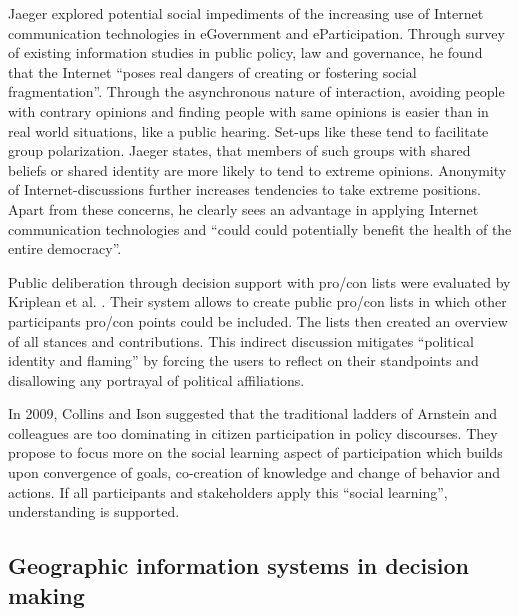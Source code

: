 Jaeger \cite{Jaeger2005_deliberate_democracy_and_egovernment} explored potential social impediments of the increasing use of Internet communication technologies in eGovernment and eParticipation. Through survey of existing information studies in public policy, law and governance, he found that the Internet ``poses real dangers of creating or fostering social fragmentation''. Through the asynchronous nature of interaction, avoiding people with contrary opinions and finding people with same opinions is easier than in real world situations, like a public hearing. Set-ups like these tend to facilitate group polarization. Jaeger states, that members of such groups with shared beliefs or shared identity are more likely to tend to extreme opinions. Anonymity of Internet-discussions further increases tendencies to take extreme positions. Apart from these concerns, he clearly sees an advantage in applying Internet communication technologies and ``could could potentially benefit the health of the entire democracy''.

Public deliberation through decision support with pro/con lists were evaluated by Kriplean et al. \cite{Kriplean2012_Considerit}. Their system allows to create public pro/con lists in which other participants pro/con points could be included. The lists then created an overview of all stances and contributions. This indirect discussion mitigates ``political identity and flaming'' by forcing the users to reflect on their standpoints and disallowing any portrayal of political affiliations.

In 2009, Collins and Ison \cite{Collins2009_social_learning} suggested that the traditional ladders of Arnstein and colleagues are too dominating in citizen participation in policy discourses. They propose to focus more on the social learning aspect of participation which builds upon convergence of goals, co-creation of knowledge and change of behavior and actions. If all participants and stakeholders apply this ``social learning'', understanding is supported.

\subsection{Geographic information systems in decision making}

